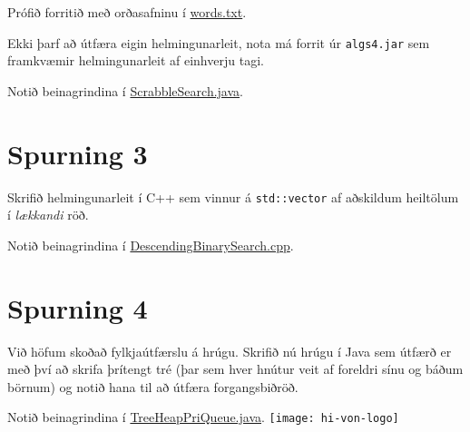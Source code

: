 \documentclass{article}
\begin{document}
Prófið forritið með orðasafninu í \href{http://introcs.cs.princeton.edu/java/data/words.txt}{words.txt}.

Ekki þarf að útfæra eigin helmingunarleit, nota má forrit úr \texttt{algs4.jar} sem framkvæmir helmingunarleit af einhverju tagi.

Notið beinagrindina í \href{https://github.com/Ernir/kennsluefni/tree/master/T2/Code/w8/ScrabbleSearch.java}{ScrabbleSearch.java}.

\section{Spurning 3}
Skrifið helmingunarleit í C++ sem vinnur á \texttt{std::vector} af aðskildum heiltölum í \emph{lækkandi} röð.

Notið beinagrindina í \href{https://github.com/Ernir/kennsluefni/tree/master/T2/Code/w8/DescendingBinarySearch.cpp}{DescendingBinarySearch.cpp}.

\section{Spurning 4}
Við höfum skoðað fylkjaútfærslu á hrúgu. Skrifið nú hrúgu í Java sem útfærð er með því að skrifa þrítengt tré (þar sem hver hnútur veit af foreldri sínu og báðum börnum) og notið hana til að útfæra forgangsbiðröð.

Notið beinagrindina í \href{https://github.com/Ernir/kennsluefni/tree/master/T2/Code/w8/TreeHeapPriQueue.java}{TreeHeapPriQueue.java}.
\vfill
\texttt{[image: hi-von-logo]}
\end{document}
